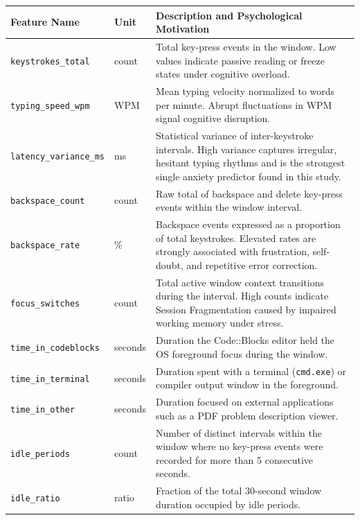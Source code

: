 \begin{table}[htbp]
    \centering
    \small
    \begin{tabular}{|p{}|p{}|p{}|}
        \hline
        \textbf{Feature Name} & \textbf{Unit} & \textbf{Description and Psychological Motivation} \\ \hline
        \texttt{keystrokes\_total} & count & Total key-press events in the window. Low values indicate passive reading or freeze states under cognitive overload. \\ \hline
        \texttt{typing\_speed\_wpm} & WPM & Mean typing velocity normalized to words per minute. Abrupt fluctuations in WPM signal cognitive disruption. \\ \hline
        \texttt{latency\_variance\_ms} & ms & Statistical variance of inter-keystroke intervals. High variance captures irregular, hesitant typing rhythms and is the strongest single anxiety predictor found in this study. \\ \hline
        \texttt{backspace\_count} & count & Raw total of backspace and delete key-press events within the window interval. \\ \hline
        \texttt{backspace\_rate} & \% & Backspace events expressed as a proportion of total keystrokes. Elevated rates are strongly associated with frustration, self-doubt, and repetitive error correction. \\ \hline
        \texttt{focus\_switches} & count & Total active window context transitions during the interval. High counts indicate Session Fragmentation caused by impaired working memory under stress. \\ \hline
        \texttt{time\_in\_codeblocks} & seconds & Duration the Code::Blocks editor held the OS foreground focus during the window. \\ \hline
        \texttt{time\_in\_terminal} & seconds & Duration spent with a terminal (\texttt{cmd.exe}) or compiler output window in the foreground. \\ \hline
        \texttt{time\_in\_other} & seconds & Duration focused on external applications such as a PDF problem description viewer. \\ \hline
        \texttt{idle\_periods} & count & Number of distinct intervals within the window where no key-press events were recorded for more than 5 consecutive seconds. \\ \hline
        \texttt{idle\_ratio} & ratio & Fraction of the total 30-second window duration occupied by idle periods. \\ \hline

\end{tabular}
\end{table}

